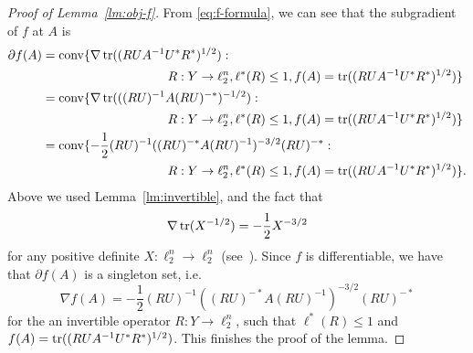 \begin{proof}[Proof of Lemma~\ref{lm:obj-f}]
  From \eqref{eq:f-formula}, we can see that the subgradient of
  $f$ at $A$ is
  \begin{align*}
  \partial f(A) &= \mathrm{conv}
  \{\nabla \tr((RUA^{-1}U^*R^*)^{1/2}):\\
  &\hspace{10em}
  R: Y \to \ell_2^n, \ell^*(R) \le 1,
  f(A) = \tr((RUA^{-1}U^*R^*)^{1/2})\}\\
  &= 
  \mathrm{conv}\{
  \nabla \tr(((RU)^{-1}A(RU)^{-*})^{-1/2}):\\ 
  &\hspace{10em}
  R: Y \to \ell_2^n, \ell^*(R) \le 1, 
  f(A) = \tr((RUA^{-1}U^*R^*)^{1/2})\}\\
  &= 
  \mathrm{conv}\{
  -\frac{1}{2} 
  (RU)^{-1} ((RU)^{-*} A (RU)^{-1})^{-3/2} (RU)^{-*}:\\ 
  &\hspace{10em}
  R: Y \to \ell_2^n, \ell^*(R) \le 1, 
  f(A) = \tr((RUA^{-1}U^*R^*)^{1/2})\}.
  \end{align*}
  Above we used Lemma~\ref{lm:invertible}, and
  the fact that 
  \[
  \nabla \operatorname{tr}(X^{-1/2}) =
  -\frac{1}{2}X^{-3/2}
  \]
  for any positive definite $X:\ell_2^n\to\ell_2^n$ (see~\cite{Lewis95}). Since $f$ is
  differentiable, we have that $\partial f(A)$ is a singleton set,
  i.e.~
  \[
  \nabla f(A) = 
  -\frac{1}{2} (RU)^{-1} ((RU)^{-*} A (RU)^{-1})^{-3/2} (RU)^{-*}
  \]
  for the an invertible operator $R: Y \to \ell_2^n$, such that
  $\ell^*(R) \le 1$ and $f(A) =
  \operatorname{tr}((RUA^{-1}U^*R^*)^{1/2})$. This finishes the proof
  of the lemma.
\end{proof}

